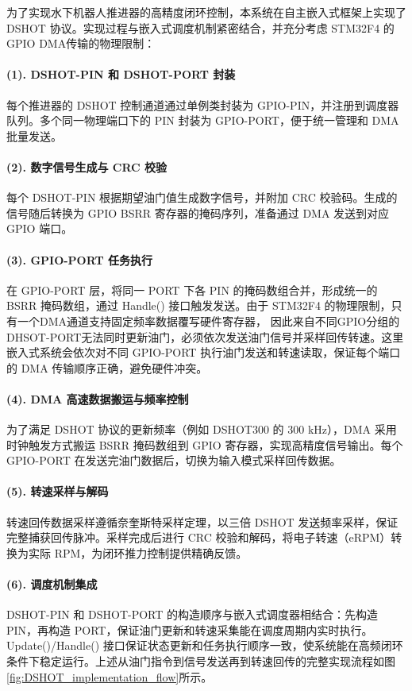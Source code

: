 为了实现水下机器人推进器的高精度闭环控制，本系统在自主嵌入式框架上实现了 DSHOT 协议。实现过程与嵌入式调度机制紧密结合，并充分考虑 STM32F4 的 GPIO DMA传输的物理限制：

\paragraph{(1). DSHOT-PIN 和 DSHOT-PORT 封装}  
每个推进器的 DSHOT 控制通道通过单例类封装为 GPIO-PIN，并注册到调度器队列。多个同一物理端口下的 PIN 封装为 GPIO-PORT，便于统一管理和 DMA 批量发送。

\paragraph{(2). 数字信号生成与 CRC 校验}  
每个 DSHOT-PIN 根据期望油门值生成数字信号，并附加 CRC 校验码。生成的信号随后转换为 GPIO BSRR 寄存器的掩码序列，准备通过 DMA 发送到对应 GPIO 端口。

\paragraph{(3). GPIO-PORT 任务执行}  
在 GPIO-PORT 层，将同一 PORT 下各 PIN 的掩码数组合并，形成统一的 BSRR 掩码数组，通过 Handle() 接口触发发送。由于 STM32F4 的物理限制，只有一个DMA通道支持固定频率数据覆写硬件寄存器，
因此来自不同GPIO分组的DHSOT-PORT无法同时更新油门，必须依次发送油门信号并采样回传转速。这里嵌入式系统会依次对不同 GPIO-PORT 执行油门发送和转速读取，保证每个端口的 DMA 传输顺序正确，避免硬件冲突。

\paragraph{(4). DMA 高速数据搬运与频率控制}  
为了满足 DSHOT 协议的更新频率（例如 DSHOT300 的 300 kHz），DMA 采用时钟触发方式搬运 BSRR 掩码数组到 GPIO 寄存器，实现高精度信号输出。每个 GPIO-PORT 在发送完油门数据后，切换为输入模式采样回传数据。

\paragraph{(5). 转速采样与解码}  
转速回传数据采样遵循奈奎斯特采样定理，以三倍 DSHOT 发送频率采样，保证完整捕获回传脉冲。采样完成后进行 CRC 校验和解码，将电子转速（eRPM）转换为实际 RPM，为闭环推力控制提供精确反馈。

\paragraph{(6). 调度机制集成}  
DSHOT-PIN 和 DSHOT-PORT 的构造顺序与嵌入式调度器相结合：先构造 PIN，再构造 PORT，保证油门更新和转速采集能在调度周期内实时执行。Update()/Handle() 接口保证状态更新和任务执行顺序一致，使系统能在高频闭环条件下稳定运行。上述从油门指令到信号发送再到转速回传的完整实现流程如图\ref{fig:DSHOT_implementation_flow}所示。

